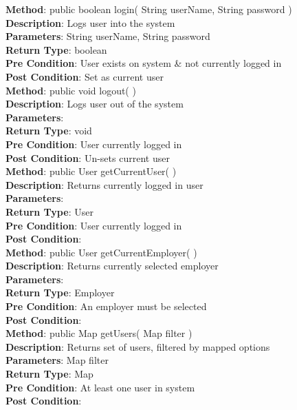 \documentclass{l3deliverable}
\begin{document}
\textbf{Method}: public boolean login( String userName, String password )\\
\textbf{Description}: Logs user into the system\\
\textbf{Parameters}: String userName, String password\\
\textbf{Return Type}: boolean\\
\textbf{Pre Condition}: User exists on system \& not currently logged in\\
\textbf{Post Condition}: Set as current user\\

\textbf{Method}: public void logout( )\\
\textbf{Description}: Logs user out of the system\\
\textbf{Parameters}:\\
\textbf{Return Type}: void\\
\textbf{Pre Condition}: User currently logged in\\
\textbf{Post Condition}: Un-sets current user\\

\textbf{Method}: public User getCurrentUser( )\\
\textbf{Description}: Returns currently logged in user\\
\textbf{Parameters}:\\
\textbf{Return Type}: User\\
\textbf{Pre Condition}: User currently logged in\\
\textbf{Post Condition}:\\

\textbf{Method}: public User getCurrentEmployer( )\\
\textbf{Description}: Returns currently selected employer\\
\textbf{Parameters}:\\
\textbf{Return Type}: Employer\\
\textbf{Pre Condition}: An employer must be selected\\
\textbf{Post Condition}:\\

\textbf{Method}: public Map getUsers( Map filter )\\
\textbf{Description}: Returns set of users, filtered by mapped options\\
\textbf{Parameters}: Map filter\\
\textbf{Return Type}: Map\\
\textbf{Pre Condition}: At least one user in system\\
\textbf{Post Condition}:\\
\end{document}

